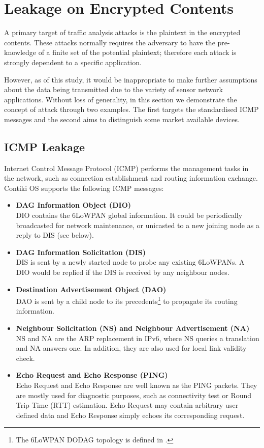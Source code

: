 \section{Leakage on Encrypted Contents}

A primary target of traffic analysis attacks is the plaintext in the encrypted contents. These attacks normally requires the adversary to have the pre-knowledge of a finite set of the potential plaintext; therefore each attack is strongly dependent to a specific application.

However, as of this study, it would be inappropriate to make further assumptions about the data being transmitted due to the variety of sensor network applications. Without loss of generality, in this section we demonstrate the concept of attack through two examples. The first targets the standardised ICMP\cite{rfc4443} messages and the second aims to distinguish some market available devices.

\subsection{ICMP Leakage}

Internet Control Message Protocol (ICMP) performs the management tasks in the network, such as connection establishment and routing information exchange. Contiki OS supports the following ICMP messages:

\begin{itemize}
	\item \textbf{DAG Information Object (DIO)} \\
	DIO contains the 6LoWPAN global information. It could be periodically broadcasted for network maintenance, or unicasted to a new joining node as a reply to DIS (see below).
	\item \textbf{DAG Information Solicitation (DIS)} \\
	DIS is sent by a newly started node to probe any existing 6LoWPANs. A DIO would be replied if the DIS is received by any neighbour nodes.
	\item \textbf{Destination Advertisement Object (DAO)} \\
	DAO is sent by a child node to its precedents\footnote{The 6LoWPAN DODAG topology is defined in \cite{rfc6550}.} to propagate its routing information.
	\item \textbf{Neighbour Solicitation (NS) and Neighbour Advertisement (NA)} \\
	NS and NA are the ARP replacement in IPv6, where NS queries a translation and NA answers one. In addition, they are also used for local link validity check.
	\item \textbf{Echo Request and Echo Response (PING)} \\
	Echo Request and Echo Response are well known as the PING packets. They are mostly used for diagnostic purposes, such as connectivity test or Round Trip Time (RTT) estimation. Echo Request may contain arbitrary user defined data and Echo Response simply echoes its corresponding request.
\end{itemize}

